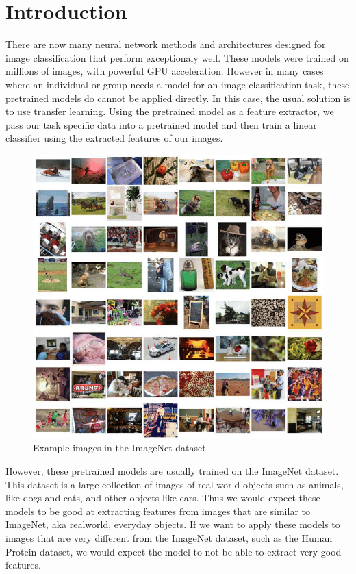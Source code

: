 \documentclass{article}
\begin{document}
 
\section{Introduction}
There are now many neural network methods and architectures designed for 
image classification that perform exceptionaly well. These models were trained
on millions of images, with powerful GPU acceleration. However in many cases where
an individual or group needs a model for an image classification task, these pretrained
models do cannot be applied directly. In this case, the usual solution is to use transfer learning.
Using the pretrained model as a feature extractor, we pass our task specific data into a 
pretrained model and then train a linear classifier using the extracted features of our images.
\begin{figure}[h!]
    \includegraphics[scale=0.43]{Examples-in-the-ImageNet-dataset.png}
    \caption{Example images in the ImageNet dataset}
\end{figure}

However, these pretrained models are usually trained on the ImageNet dataset. This dataset is a large
collection of images of real world objects such as animals, like dogs and cats, and other objects like cars.
Thus we would expect these models to be good at extracting features from images that are similar to ImageNet,
aka realworld, everyday objects. If we want to apply these models to images that are very different from 
the ImageNet dataset, such as the Human Protein dataset, we would expect the model to 
not be able to extract very good features.
\end{document}
